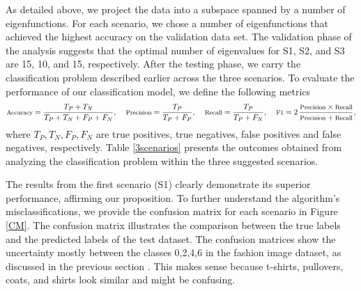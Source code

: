 As detailed above, we project the data into a subspace spanned by a number of eigenfunctions. For each scenario, we chose a number of eigenfunctions that achieved the highest accuracy on the validation data set. The validation phase of the analysis suggests that the optimal number of eigenvalues for S1, S2, and S3 are 15, 10, and 15, respectively. After the testing phase, we carry the classification problem described earlier across the three scenarios.
To evaluate the performance of our classification model, we define the following metrics
\begin{equation*}\footnotesize
        \text{Accuracy} = \frac{T_P + T_N}{T_P + T_N + F_P + F_N}, \ \ \ \  \text{Precision} = \frac{T_P}{T_P + F_P}, \ \ \ \  \text{Recall} = \frac{T_P}{T_P + F_N}, \ \ \ \ \text{F1} = 2 \, \frac{\text{Precision} \times \text{Recall}}{\text{Precision} + \text{Recall}},
        \end{equation*}
        where $T_P, T_N, F_P, F_N$ are true positives, true negatives, false positives and false negatives, respectively. 
Table \ref{3scenarios} presents the outcomes obtained from analyzing the classification problem within the three suggested scenarios.



\begin{table}[h]
\centering
\caption{\footnotesize Accuracy, Precision, Recall and F1 Score of the classification problem in each scenario.}
\centering
\label{3scenarios}
\end{table}
\vspace{-.22cm}
The results from the first scenario (S1) clearly demonstrate its superior performance, affirming our proposition. To further understand the algorithm's misclassifications, we provide the confusion matrix for each scenario in Figure \ref{CM}. The confusion matrix illustrates the comparison between the true labels and the predicted labels of the test dataset. The confusion matrices show the uncertainty mostly between the classes 0,2,4,6 in the fashion image dataset, as discussed in the previous section . This makes sense because t-shirts, pullovers, coats, and shirts look similar and might be confusing.
 
